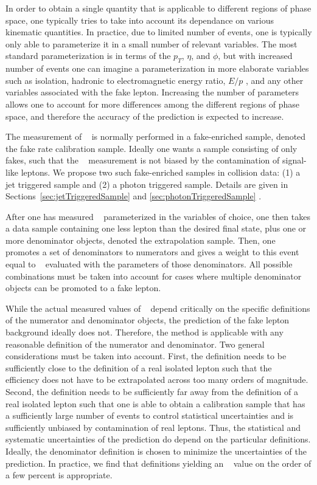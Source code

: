 \documentclass{cmspaper}
\begin{document}
In order to obtain a single quantity that is applicable to different regions of phase space, one typically tries to take into account its dependance on various kinematic quantities. In practice, due to limited number of events, one is typically only able to parameterize it in a small number of relevant variables. The most standard parameterization is in terms of the $p_T$, $\eta$, and $\phi$, but with increased number of events one can imagine a parameterization in more elaborate variables such as isolation, hadronic to electromagnetic energy ratio, $E/p$ , and any other variables associated with the fake lepton. Increasing the number of parameters allows one to account for more differences among the different regions of phase space, and therefore the accuracy of the prediction is expected to increase.

The measurement of \epsilonFake~ is normally performed in a fake-enriched sample, denoted the fake rate calibration sample. Ideally one wants a sample consisting of only fakes, such that the \epsilonFake~ measurement is not biased by the contamination of signal-like leptons. We propose two such fake-enriched samples in collision data: (1) a jet triggered sample and (2) a photon triggered sample. Details are given in Sections~\ref{sec:jetTriggeredSample} and \ref{sec:photonTriggeredSample} .

After one has measured \epsilonFake~ parameterized in the variables of choice, one then takes a data sample containing one less lepton than the desired final state, plus one or more denominator objects, denoted the extrapolation sample. Then, one promotes a set of denominators to numerators and gives a weight to this event equal to \epsilonFake~ evaluated with the parameters of those denominators. All possible combinations must be taken into account for cases where multiple denominator objects can be promoted to a fake lepton.

While the actual measured values of \epsilonFake~ depend critically on the specific definitions of the numerator and denominator objects, the prediction of the fake lepton background ideally does not. Therefore, the method is applicable with any reasonable definition of the numerator and denominator. Two general considerations must be taken into account. First, the definition needs to be sufficiently close to the definition of a real isolated lepton such that the \epsilonFake~ efficiency does not have to be extrapolated across too many orders of magnitude. Second, the definition needs to be sufficiently far away from the definition of a real isolated lepton such that one is able to obtain a calibration sample that has a sufficiently large number of events to control statistical uncertainties and is sufficiently unbiased by contamination of real leptons.  Thus, the statistical and systematic uncertainties of the prediction do depend on the particular definitions. Ideally, the denominator definition is chosen to minimize the uncertainties of the prediction. In practice, we find that definitions yielding an \epsilonFake~ value on the order of a few percent is appropriate.
\end{document}
